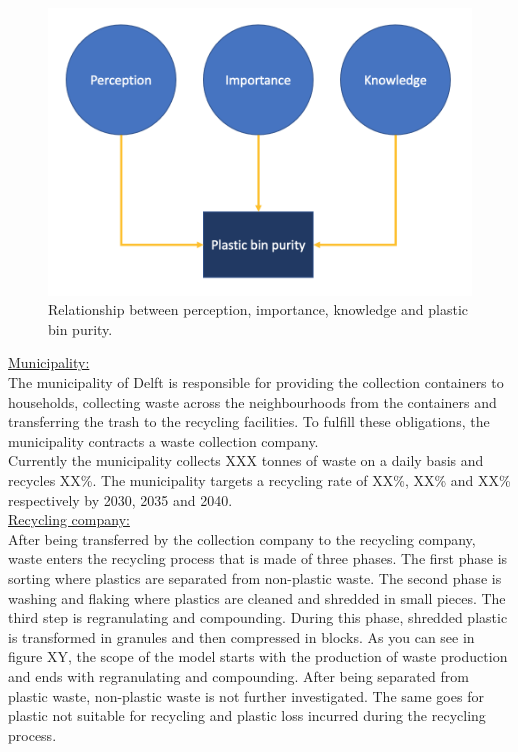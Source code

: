 \begin{figure}[H]
    \centering
        \captionsetup{width=\linewidth}
        \includegraphics[width=0.7\linewidth]{Images/influences.png}
        \caption{Relationship between perception, importance, knowledge and plastic bin purity.}
    \label{fig:Relationship between perception, importance, knowledge and plastic bin purity.}
\end{figure}

\underline{Municipality:}\\
\noindent The municipality of Delft is responsible for providing the collection containers to households, collecting waste across the neighbourhoods from the containers and transferring the trash to the recycling facilities. To fulfill these obligations, the municipality contracts a waste collection company. \\

\noindent Currently the municipality collects XXX tonnes of waste on a daily basis and recycles XX\%. The municipality targets a recycling rate of XX\%, XX\% and XX\% respectively by 2030, 2035 and 2040. \\

\underline{Recycling company:}\\
After being transferred by the collection company to the recycling company, waste enters the recycling process that is made of three phases. The first phase is sorting where plastics are separated from non-plastic waste. The second phase is washing and flaking where plastics are cleaned and shredded in small pieces. The third step is regranulating and  compounding. During this phase, shredded plastic is transformed in granules and then compressed in blocks. As you can see in figure XY, the scope of the model starts with the production of waste production and ends with regranulating and compounding. After being separated from plastic waste, non-plastic waste is not further investigated. The same goes for plastic not suitable for recycling and plastic loss incurred during the recycling process. \\

